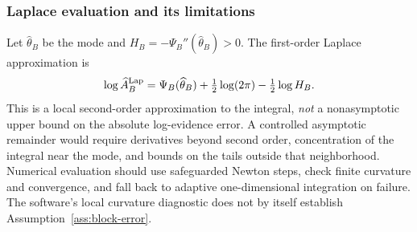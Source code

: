 \subsubsection{Laplace evaluation and its limitations}
Let $\widehat\theta_B$ be the mode and $H_B=-\Psi_B''(\widehat\theta_B)>0$. The first-order Laplace approximation is
\begin{equation}
\log\widehat A_B^{\rm Lap}=\Psi_B(\widehat\theta_B)
+\tfrac12\log(2\pi)-\tfrac12\log H_B.
\label{eq:laplace-paper}
\end{equation}
This is a local second-order approximation to the integral, \emph{not} a nonasymptotic upper bound on the absolute log-evidence error. A controlled asymptotic remainder would require derivatives beyond second order, concentration of the integral near the mode, and bounds on the tails outside that neighborhood. Numerical evaluation should use safeguarded Newton steps, check finite curvature and convergence, and fall back to adaptive one-dimensional integration on failure. The software's local curvature diagnostic does not by itself establish Assumption~\ref{ass:block-error}.

